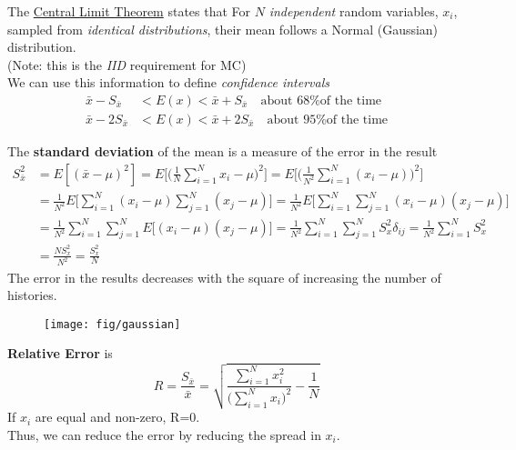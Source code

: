 \documentclass[12pt]{article}
\begin{document}
The \underline{Central Limit Theorem} states that
For $N$ \textit{independent} random variables, $x_i$, sampled from \textit{identical distributions}, their mean follows a Normal (Gaussian) distribution.\\
(Note: this is the \textit{IID} requirement for MC)\\
We can use this information to define \textit{confidence intervals}
\begin{align*}
\bar{x} - S_{\bar{x}} &< E(x) < \bar{x} + S_{\bar{x}} \quad \text{about 68\% of the time}\\
\bar{x} - 2S_{\bar{x}} &< E(x) < \bar{x} + 2S_{\bar{x}} \quad \text{about 95\% of the time}
\end{align*}

The \textbf{standard deviation} of the mean is a measure of the error in the result
\begin{align*}
S_{\bar{x}}^2 &= E[(\bar{x} - \mu)^2] = E\biggl[ \biggl(\frac{1}{N}\sum_{i=1}^N x_i - \mu\biggr)^2\biggr] = E\biggl[ \biggl(\frac{1}{N^2}\sum_{i=1}^N (x_i - \mu)\biggr)^2\biggr]\\
%
&=\frac{1}{N^2} E\biggl[ \sum_{i=1}^N (x_i - \mu) \sum_{j=1}^N (x_j - \mu)\biggr] = \frac{1}{N^2} E\biggl[ \sum_{i=1}^N \sum_{j=1}^N (x_i - \mu)  (x_j - \mu)\biggr]\\
%
&= \frac{1}{N^2} \sum_{i=1}^N \sum_{j=1}^N E\bigl[  (x_i - \mu)  (x_j - \mu)\bigr] = \frac{1}{N^2} \sum_{i=1}^N \sum_{j=1}^N S^2_x \delta_{ij} = \frac{1}{N^2} \sum_{i=1}^N S_x^2 \\
%
&= \frac{N S_x^2}{N^2} = \boxed{\frac{S_x^2}{N}}
\end{align*}
The error in the results decreases with the square of increasing the number of histories.
%
\begin{figure}[h!]
\begin{center}
  \texttt{[image: fig/gaussian]}
\end{center}
  \label{fig:gaussian}
\end{figure}

\textbf{Relative Error} is 
\[
R = \frac{S_{\bar{x}}}{\bar{x}} = \sqrt{\frac{\sum_{i=1}^N x_i^2}{\bigl(\sum_{i=1}^N x_i\bigr)^2} - \frac{1}{N}} 
\]
If $x_i$ are equal and non-zero, R=0.\\
Thus, we can reduce the error by reducing the spread in $x_i$.
\end{document}
